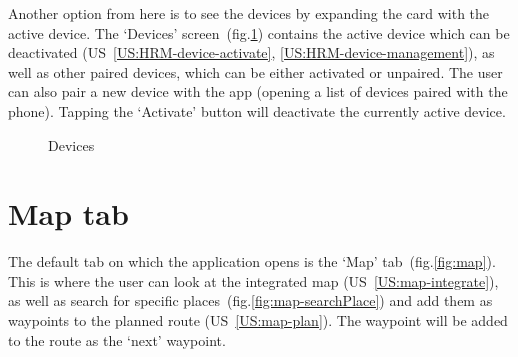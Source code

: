Another option from here is to see the devices by expanding the card with the active device.
The `Devices' screen~(fig.\ref{fig:devices}) contains the active device which can be deactivated (US~\ref{US:HRM-device-activate}, \ref{US:HRM-device-management}), as well as other paired devices, which can be either activated or unpaired.
The user can also pair a new device with the app (opening a list of devices paired with the phone).
Tapping the `Activate' button will deactivate the currently active device.

\begin{figure}[h!]
    \centering
    \hfill
    \caption{Devices}
    \label{fig:devices}
\end{figure}

\section{Map tab}
The default tab on which the application opens is the `Map' tab~(fig.\ref{fig:map}).
This is where the user can look at the integrated map (US~\ref{US:map-integrate}), as well as search for specific places~(fig.\ref{fig:map-searchPlace}) and add them as waypoints to the planned route (US~\ref{US:map-plan}).
The waypoint will be added to the route as the `next' waypoint.

